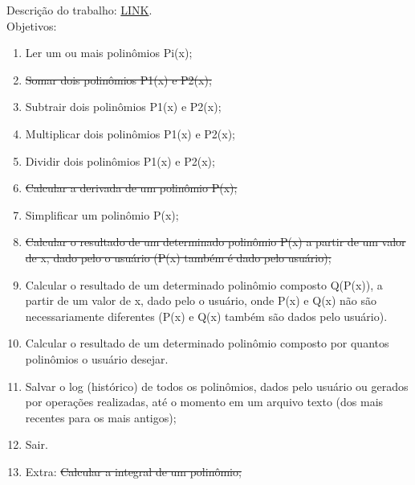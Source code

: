 \documentclass[a4paper]{article}
\begin{document}
Descrição do trabalho:
\href{https://sites.google.com/site/christianersbrasil/classroom-news/descricaodotrabalho-gbc024cacb}
{LINK}.\\

Objetivos:
\begin{enumerate}
\item Ler um ou mais polinômios Pi(x);
\item \sout{Somar dois polinômios P1(x) e P2(x);}
\item Subtrair dois polinômios P1(x) e P2(x);
\item Multiplicar dois polinômios P1(x) e P2(x); 
\item Dividir dois polinômios P1(x) e P2(x);
\item \sout{Calcular a derivada de um polinômio P(x);}
\item Simplificar um polinômio P(x);
\item \sout{Calcular o resultado de um determinado polinômio P(x) a partir de um valor de x,
 dado pelo o usuário (P(x) também é dado pelo usuário);}
\item Calcular o resultado de um determinado polinômio composto Q(P(x)), a partir de 
um valor de x, dado pelo o usuário, onde P(x) e Q(x) não são necessariamente 
diferentes (P(x) e Q(x) também são dados pelo usuário).
\item Calcular o resultado de um determinado polinômio composto por quantos 
polinômios o usuário desejar.
\item Salvar o log (histórico) de todos os polinômios, dados pelo usuário ou gerados 
por operações realizadas, até o momento em um arquivo texto (dos mais 
recentes para os mais antigos);
\item Sair.
\item Extra: \sout{Calcular a integral de um polinômio;}
\end{enumerate}
\end{document}
